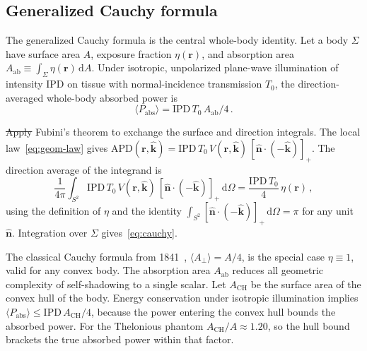 \documentclass[journal,twocolumn,10pt]{IEEEtran}
\newcommand{\khat}{\hat{\bm{k}}}
\newcommand{\nhat}{\hat{\bm{n}}}
\newcommand{\rr}{\mathbf{r}}
\newcommand{\IPD}{\mathrm{IPD}}
\newcommand{\APD}{\mathrm{APD}}
\newcommand{\Aab}{A_{\mathrm{ab}}}
\newcommand{\Aperp}{A_\perp}
\newcommand{\diff}{\mathrm{d}}
\newcommand{\pospart}[1]{\left[#1\right]_{+}}
\newcommand{\Vis}{V}
\providecommand{\DIFaddtex}[1]{{\protect\color{blue}\uwave{#1}}} %
\providecommand{\DIFdeltex}[1]{{\protect\color{red}\sout{#1}}}                      %
\providecommand{\DIFaddbegin}{} %
\providecommand{\DIFaddend}{} %
\providecommand{\DIFdelbegin}{} %
\providecommand{\DIFdelend}{} %
\providecommand{\DIFadd}[1]{\texorpdfstring{\DIFaddtex{#1}}{#1}} %
\providecommand{\DIFdel}[1]{\texorpdfstring{\DIFdeltex{#1}}{}} %
\newcommand{\DIFscaledelfig}{0.5}
\newlength{\DIFdelgraphicswidth} %
\newlength{\DIFdelgraphicsheight} %
\newcommand{\DIFaddincludegraphics}[2][]{{\color{blue}\fbox{\DIFOincludegraphics[#1]{#2}}}} %
\newcommand{\DIFdelincludegraphics}[2][]{%
\sbox{\DIFdelgraphicsbox}{\DIFOincludegraphics[#1]{#2}}%
\settoboxwidth{\DIFdelgraphicswidth}{\DIFdelgraphicsbox} %
\settoboxtotalheight{\DIFdelgraphicsheight}{\DIFdelgraphicsbox} %
\scalebox{\DIFscaledelfig}{%
\parbox[b]{\DIFdelgraphicswidth}{\usebox{\DIFdelgraphicsbox}\\[-\baselineskip] \rule{\DIFdelgraphicswidth}{0em}}\llap{\resizebox{\DIFdelgraphicswidth}{\DIFdelgraphicsheight}{%
\setlength{\unitlength}{\DIFdelgraphicswidth}%
\begin{picture}(1,1)%
\thicklines\linethickness{2pt} %
{\color[rgb]{1,0,0}\put(0,0){\framebox(1,1){}}}%
{\color[rgb]{1,0,0}\put(0,0){\line( 1,1){1}}}%
{\color[rgb]{1,0,0}\put(0,1){\line(1,-1){1}}}%
\end{picture}%
}\hspace*{3pt}}} %
} %
\DeclareRobustCommand{\DIFaddbegin}{\DIFOaddbegin \let\includegraphics\DIFaddincludegraphics} %
\DeclareRobustCommand{\DIFaddend}{\DIFOaddend \let\includegraphics\DIFOincludegraphics} %
\DeclareRobustCommand{\DIFdelbegin}{\DIFOdelbegin \let\includegraphics\DIFdelincludegraphics} %
\DeclareRobustCommand{\DIFdelend}{\DIFOaddend \let\includegraphics\DIFOincludegraphics} %
\begin{document}
\subsection{Generalized Cauchy formula}\label{subsec:cauchy-thm}

The generalized Cauchy formula is the central whole-body identity.
\DIFdelbegin %
\DIFdelend Let a body $\Sigma$ have surface area $A$, exposure fraction
$\eta(\rr)$, and absorption area
$\Aab \equiv \int_\Sigma \eta(\rr)\,\diff A$. Under isotropic,
unpolarized plane-wave illumination of intensity $\IPD$ on tissue
with normal-incidence transmission $T_0$, the direction-averaged
whole-body absorbed power is
\begin{equation}\label{eq:cauchy}
  \langle P_{\mathrm{abs}} \rangle = \IPD\,T_0\,\Aab/4\, .
\end{equation}
\DIFdelbegin %
\DIFdelend

\DIFdelbegin %
\DIFdel{Apply }\DIFdelend \DIFaddbegin \DIFadd{To see why, apply }\DIFaddend Fubini's theorem to exchange the surface and direction
integrals. The local law~\eqref{eq:geom-law} gives
$\APD(\rr,\khat) = \IPD\,T_0\,\Vis(\rr,\khat)\,
\pospart{\nhat\cdot(-\khat)}$. The direction average of the integrand
is
\[
  \frac{1}{4\pi}\int_{S^2}
  \IPD\,T_0\,\Vis(\rr,\khat)\,\pospart{\nhat\cdot(-\khat)}\,
  \diff\Omega
  = \frac{\IPD\,T_0}{4}\,\eta(\rr)\,,
\]
using the definition of $\eta$ and the identity $\int_{S^2}
\pospart{\nhat\cdot(-\khat)}\,\diff\Omega = \pi$ for any unit
$\nhat$. Integration over $\Sigma$ gives~\eqref{eq:cauchy}.
\DIFdelbegin %
\DIFdelend

The classical Cauchy formula from 1841~\cite{Cauchy1841},
$\langle\Aperp\rangle = A/4$, is the special case $\eta \equiv 1$,
valid for any convex body. The
absorption area $\Aab$ reduces all geometric complexity of
self-shadowing to a single scalar. Let $A_{\mathrm{CH}}$ be the
surface area of the convex hull of the body. Energy conservation under
isotropic illumination implies
$\langle P_{\mathrm{abs}} \rangle \le \IPD\,A_{\mathrm{CH}}/4$, because
the power entering the convex hull bounds the absorbed power. For the
Thelonious phantom $A_{\mathrm{CH}}/A \approx 1.20$, so the hull bound
brackets the true absorbed power within that factor.
\end{document}
